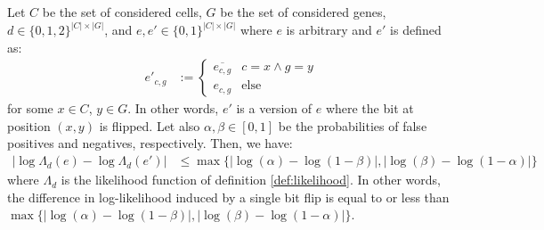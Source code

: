 \begin{lemma}
    \label{lem:bitflip}
    Let $C$ be the set of considered cells, $G$ be the set of considered genes, $d \in \{0,1,2\}^{|C| \times |G|}$, and $e, e' \in \{0,1\}^{|C| \times |G|}$ where $e$ is arbitrary and $e'$ is defined as:
    \begin{align*}
        e'_{c,g} &:= \begin{cases}
            \overline{e_{c,g}} & c = x \wedge g = y \\
            e_{c,g} & \text{else}
        \end{cases}
    \end{align*}
    for some $x \in C$, $y \in G$. In other words, $e'$ is a version of $e$ where the bit at position $(x,y)$ is flipped. Let also $\alpha, \beta \in [0,1]$ be the probabilities of false positives and negatives, respectively. Then, we have:
    \begin{align*}
        |\log\Lambda_d(e) - \log\Lambda_d(e')| &\leq \max\{|\log(\alpha) - \log(1-\beta)|, |\log(\beta) - \log(1-\alpha)|\}
    \end{align*}
    where $\Lambda_d$ is the likelihood function of definition \ref{def:likelihood}. In other words, the difference in log-likelihood induced by a single bit flip is equal to or less than $\max\{|\log(\alpha) - \log(1-\beta)|, |\log(\beta) - \log(1-\alpha)|\}$.
\end{lemma}

